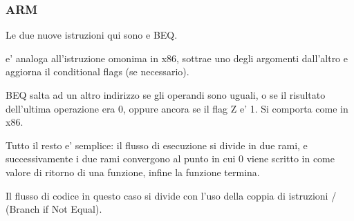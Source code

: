 \subsubsection{ARM}





Le due nuove istruzioni qui sono \CMP e \ac{BEQ}.

\CMP e' analoga all'istruzione omonima in x86, sottrae uno degli argomenti dall'altro e aggiorna il conditional flags (se necessario).

\ac{BEQ} salta ad un altro indirizzo se gli operandi sono uguali, o se il risultato dell'ultima operazione era 0, oppure ancora se il flag Z e' 1.
Si comporta come \JZ in x86.

Tutto il resto e' semplice: il flusso di esecuzione si divide in due rami, e successivamente i due rami convergono al punto in cui 0 viene scritto in 
 come valore di ritorno di una funzione, infine la funzione termina.




Il flusso di codice in questo caso si divide con l'uso della coppia di istruzioni / (Branch if Not Equal).

